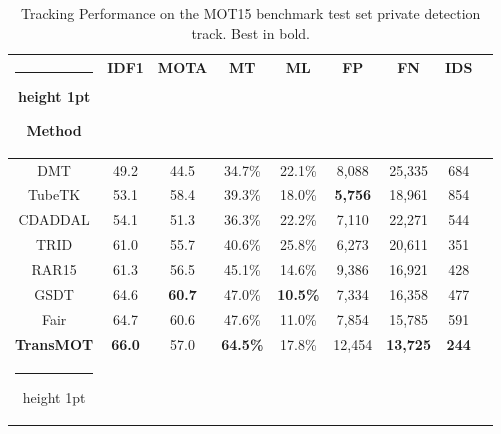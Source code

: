 \documentclass[10pt,twocolumn,letterpaper]{article}
\makeatletter
\newcommand{\thickhline}{\noalign {\ifnum 0=`}\fi \hrule height 1pt
    \futurelet \reserved@a \@xhline
}
\makeatother
\begin{document}
\begin{table}[!t]
	\footnotesize
	\begin{center}
		
		
		\begin{tabular}{c@{\hskip 0.1mm}|@{\hskip 1.5mm}c@{\hskip 1.5mm}c@{\hskip 1.5mm}c@{\hskip 1.5mm}c@{\hskip 1.5mm}c@{\hskip 1.5mm}c@{\hskip 1.5mm}c@{\hskip 1.5mm}c@{\hskip 1.5mm}}
			\hline\thickhline
			 Method & IDF1 & MOTA & MT & ML & FP & FN & IDS\\
			\hline
			DMT\cite{kim2016cdt} & 49.2 & 44.5 & 34.7\% &22.1\% & 8,088 & 25,335 & 684 \\
			




TubeTK \cite{Pang_2020_CVPR}& 53.1 & 58.4 & 39.3\%& 18.0\%& \textbf{5,756}& 18,961 &854\\


			CDADDAL\cite{bae2018confidence} & 54.1 & 51.3 & 36.3\% &22.2\% & 7,110 & 22,271 & 544 \\
			
 			TRID \cite{manen2017pathtrack}& 61.0& 55.7 & 40.6\%& 25.8\%& 6,273 & 20,611 & 351 \\
			 
			RAR15 \cite{fang2018recurrent}& 61.3 & 56.5 & 45.1\%& 14.6\%& 9,386& 16,921 &428\\
			 
			GSDT \cite{wang2020joint}& 64.6 & \textbf{60.7} & 47.0\%& \textbf{10.5\%} & 7,334	 & 16,358 & 477\\
			Fair \cite{zhang2020fairmot}& 64.7 & 60.6 & 47.6\%& 11.0\% & 7,854	 & 15,785 & 591\\
			\hline

			 \textbf{TransMOT} &\textbf{66.0}&57.0&\textbf{64.5\%} &17.8\% &12,454  &\textbf{13,725} & \textbf{244}\\
			\hline\thickhline
		\end{tabular}

	\end{center}
	\vspace{-2mm}
			\caption{Tracking Performance on the MOT15 benchmark test set private detection track. Best in bold.}
		\label{table:res15p}
\end{table}
\end{document}
